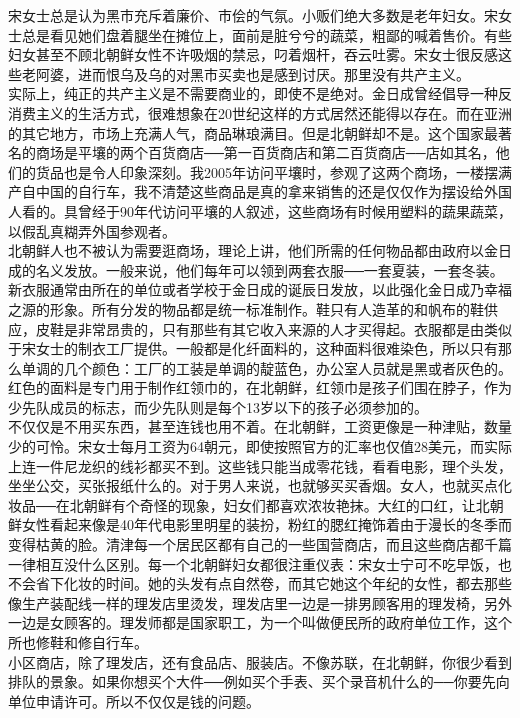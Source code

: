 宋女士总是认为黑市充斥着廉价、市侩的气氛。小贩们绝大多数是老年妇女。宋女士总是看见她们盘着腿坐在摊位上，面前是脏兮兮的蔬菜，粗鄙的喊着售价。有些妇女甚至不顾北朝鲜女性不许吸烟的禁忌，叼着烟杆，吞云吐雾。宋女士很反感这些老阿婆，进而恨乌及乌的对黑市买卖也是感到讨厌。那里没有共产主义。\\

实际上，纯正的共产主义是不需要商业的，即使不是绝对。金日成曾经倡导一种反消费主义的生活方式，很难想象在20世纪这样的方式居然还能得以存在。而在亚洲的其它地方，市场上充满人气，商品琳琅满目。但是北朝鲜却不是。这个国家最著名的商场是平壤的两个百货商店──第一百货商店和第二百货商店──店如其名，他们的货品也是令人印象深刻。我2005年访问平壤时，参观了这两个商场，一楼摆满产自中国的自行车，我不清楚这些商品是真的拿来销售的还是仅仅作为摆设给外国人看的。具曾经于90年代访问平壤的人叙述，这些商场有时候用塑料的蔬果蔬菜，以假乱真糊弄外国参观者。\\

北朝鲜人也不被认为需要逛商场，理论上讲，他们所需的任何物品都由政府以金日成的名义发放。一般来说，他们每年可以领到两套衣服──一套夏装，一套冬装。新衣服通常由所在的单位或者学校于金日成的诞辰日发放，以此强化金日成乃幸福之源的形象。所有分发的物品都是统一标准制作。鞋只有人造革的和帆布的鞋供应，皮鞋是非常昂贵的，只有那些有其它收入来源的人才买得起。衣服都是由类似于宋女士的制衣工厂提供。一般都是化纤面料的，这种面料很难染色，所以只有那么单调的几个颜色：工厂的工装是单调的靛蓝色，办公室人员就是黑或者灰色的。红色的面料是专门用于制作红领巾的，在北朝鲜，红领巾是孩子们围在脖子，作为少先队成员的标志，而少先队则是每个13岁以下的孩子必须参加的。\\

不仅仅是不用买东西，甚至连钱也用不着。在北朝鲜，工资更像是一种津贴，数量少的可怜。宋女士每月工资为64朝元，即使按照官方的汇率也仅值28美元，而实际上连一件尼龙织的线衫都买不到。这些钱只能当成零花钱，看看电影，理个头发，坐坐公交，买张报纸什么的。对于男人来说，也就够买买香烟。女人，也就买点化妆品──在北朝鲜有个奇怪的现象，妇女们都喜欢浓妆艳抹。大红的口红，让北朝鲜女性看起来像是40年代电影里明星的装扮，粉红的腮红掩饰着由于漫长的冬季而变得枯黄的脸。清津每一个居民区都有自己的一些国营商店，而且这些商店都千篇一律相互没什么区别。每一个北朝鲜妇女都很注重仪表：宋女士宁可不吃早饭，也不会省下化妆的时间。她的头发有点自然卷，而其它她这个年纪的女性，都去那些像生产装配线一样的理发店里烫发，理发店里一边是一排男顾客用的理发椅，另外一边是女顾客的。理发师都是国家职工，为一个叫做便民所的政府单位工作，这个所也修鞋和修自行车。\\

小区商店，除了理发店，还有食品店、服装店。不像苏联，在北朝鲜，你很少看到排队的景象。如果你想买个大件──例如买个手表、买个录音机什么的──你要先向单位申请许可。所以不仅仅是钱的问题。\\

